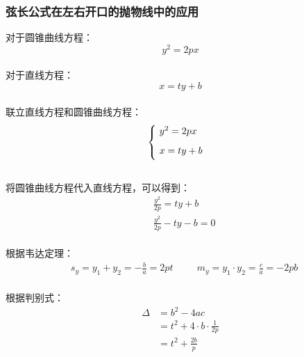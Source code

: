 \documentclass[UTF8]{ctexart}
\begin{document}
\subsubsection{弦长公式在左右开口的抛物线中的应用}
    对于圆锥曲线方程：
    \setcounter{equation}{0}
    \begin{equation}
        y^2=2px
    \end{equation}\\
    对于直线方程：
    \begin{equation}
        x=ty+b
    \end{equation}\\
    联立直线方程和圆锥曲线方程：
    \begin{equation}
        \begin{cases}
            \ y^2=2px\\[2mm]
            \ x=ty+b\vspace{3pt}
        \end{cases}
    \end{equation}\\[3mm]
    将圆锥曲线方程代入直线方程，可以得到：\vspace{5pt}
    \begin{align}
        &\frac{y^2}{2p}=ty+b\\[3mm]
        &\frac{y^2}{2p}-ty-b=0
    \end{align}\\[1mm]
    根据韦达定理：
    \begin{align}
        &s_y=y_1+y_2=-\frac{b}{a}=2pt\qquad~~
        m_y=y_1\cdot y_2=\frac{c}{a}=-2pb
    \end{align}\\[1mm]
    根据判别式：
    \begin{align}
        \Delta&=b^2-4ac\\[4mm]
        &=t^2+4\cdot b\cdot\frac{1}{2p}\\[4mm]
        &=t^2+\frac{2b}{p}
    \end{align}

\newpage
\end{document}
